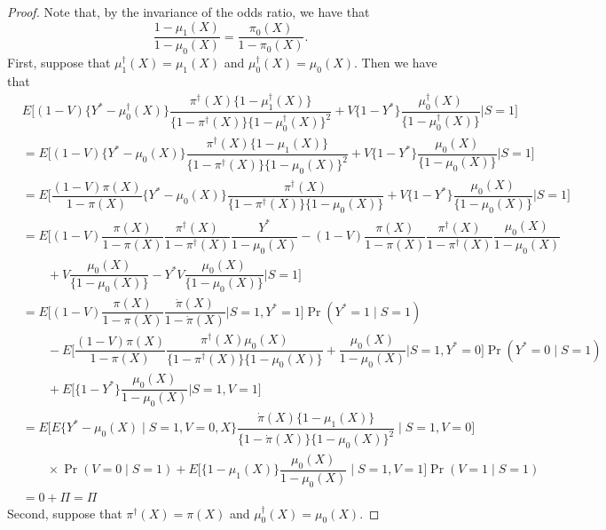 \begin{proof}
    Note that, by the invariance of the odds ratio, we have that
    \begin{equation*}
        \dfrac{1 - \mu_1(X)}{1 - \mu_0(X)} = \dfrac{\pi_0(X)}{1 - \pi_0(X)}.
    \end{equation*}
    First, suppose that $\mu_1^\dagger(X) = \mu_1(X)$ and $\mu_0^\dagger(X) = \mu_0(X)$. Then we have that 
    \begin{align*}
            &E\bigg[(1 - V)\{Y^* - \mu^\dagger_0(X)\}\dfrac{\pi^\dagger(X)\{1 - \mu^\dagger_1(X)\}}{\{1 - \pi^\dagger(X)\}\{1 - \mu^\dagger_0(X)\}^2} + V\{1-Y^*\}\dfrac{\mu^\dagger_0(X)}{\{1 - \mu^\dagger_0(X)\}}\bigg| S=1\bigg]\\
            &= E\bigg[(1 - V)\{Y^* - \mu_0(X)\}\dfrac{\pi^\dagger(X)\{1 - \mu_1(X)\}}{\{1 - \pi^\dagger(X)\}\{1 - \mu_0(X)\}^2} + V\{1-Y^*\}\dfrac{\mu_0(X)}{\{1 - \mu_0(X)\}}\bigg| S=1\bigg] \\
            &= E\bigg[\dfrac{(1 - V)\pi(X)}{1 - \pi(X)}\{Y^* - \mu_0(X)\}\dfrac{\pi^\dagger(X)}{\{1 - \pi^\dagger(X)\}\{1 - \mu_0(X)\}} + V\{1-Y^*\}\dfrac{\mu_0(X)}{\{1 - \mu_0(X)\}}\bigg| S=1\bigg] \\
            &= E\bigg[(1 - V)\dfrac{\pi(X)}{1 - \pi(X)}\dfrac{\pi^\dagger(X)}{1 - \pi^\dagger(X)} \dfrac{Y^*}{1 - \mu_0(X)} - (1 - V)\dfrac{\pi(X)}{1 - \pi(X)}\dfrac{\pi^\dagger(X)}{1 - \pi^\dagger(X)} \dfrac{\mu_0(X)}{1 - \mu_0(X)} \\
            &\qquad +  V\dfrac{\mu_0(X)}{\{1 - \mu_0(X)\}} - Y^*V \dfrac{\mu_0(X)}{\{1 - \mu_0(X)\}} \bigg| S=1\bigg] \\
            &= E\bigg[(1 - V) \dfrac{\pi(X)}{1 - \pi(X)}\dfrac{\dot\pi(X)}{1 - \dot\pi(X)}\bigg| S=1, Y^*=1\bigg]\Pr(Y^*=1\mid  S=1) \\
            &\qquad - E\bigg[\dfrac{(1 - V)\pi(X)}{1 - \pi(X)}\dfrac{\pi^\dagger(X)\mu_0(X)}{\{1 - \pi^\dagger(X)\}\{1 - \mu_0(X)\}} + \dfrac{\mu_0(X)}{1-\mu_0(X)}\bigg| S = 1, Y^* = 0 \bigg]\Pr(Y^*=0\mid  S=1) \\
            &\qquad + E\bigg[\{1-Y^*\}\dfrac{\mu_0(X)}{1-\mu_0(X)}\bigg| S = 1, V = 1\bigg] \\
            &= E\bigg[E \{Y^*-  \mu_0(X)\mid S=1, V=0, X\}\dfrac{\dot\pi(X)\{1 - \mu_1(X)\}}{\{1 - \dot\pi(X)\}\{1 - \mu_0(X)\}^2} \mid S=1, V = 0\bigg] \\
            &\qquad \times \Pr(V=0\mid  S=1) + E\bigg[\{1-\mu_1(X)\}\dfrac{\mu_0(X)}{1-\mu_0(X)}\mid  S=1, V = 1\bigg] \Pr(V =1 \mid S = 1)\\
            &= 0 + \Pi = \Pi
        \end{align*}
    Second, suppose that $\pi^\dagger(X) = \pi(X)$ and $\mu_0^\dagger(X) = \mu_0(X)$. 
\end{proof}
